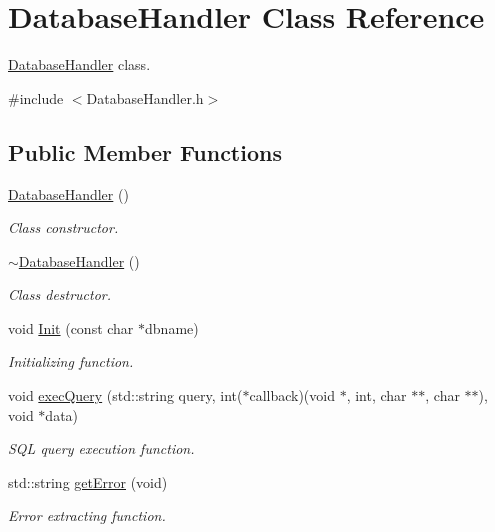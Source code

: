 \hypertarget{class_database_handler}{}\section{Database\+Handler Class Reference}
\label{class_database_handler}


\hyperlink{class_database_handler}{Database\+Handler} class.  




{\ttfamily \#include $<$Database\+Handler.\+h$>$}

\subsection*{Public Member Functions}
\begin{DoxyCompactItemize}
\item 
\hyperlink{class_database_handler_ac27357d3431faf4fd6810483a24a43fd}{Database\+Handler} ()\hypertarget{class_database_handler_ac27357d3431faf4fd6810483a24a43fd}{}\label{class_database_handler_ac27357d3431faf4fd6810483a24a43fd}

\begin{DoxyCompactList}\small\item\em Class constructor. \end{DoxyCompactList}\item 
\hyperlink{class_database_handler_a54cc84549167c9d6a94ba686cf64a27f}{$\sim$\+Database\+Handler} ()
\begin{DoxyCompactList}\small\item\em Class destructor. \end{DoxyCompactList}\item 
void \hyperlink{class_database_handler_a2e07bb30c5f4658391e62fa06fa6af16}{Init} (const char $\ast$dbname)
\begin{DoxyCompactList}\small\item\em Initializing function. \end{DoxyCompactList}\item 
void \hyperlink{class_database_handler_a51568e235c1589bb1cb08666ba5aef71}{exec\+Query} (std\+::string query, int($\ast$callback)(void $\ast$, int, char $\ast$$\ast$, char $\ast$$\ast$), void $\ast$data)
\begin{DoxyCompactList}\small\item\em S\+QL query execution function. \end{DoxyCompactList}\item 
std\+::string \hyperlink{class_database_handler_a5162cd33b92072be457be57fdcc61284}{get\+Error} (void)
\begin{DoxyCompactList}\small\item\em Error extracting function. \end{DoxyCompactList}\end{DoxyCompactItemize}


